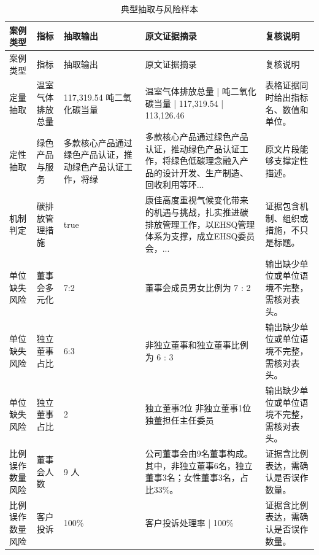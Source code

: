 \setlength{\tabcolsep}{3pt}
\renewcommand{\arraystretch}{1.18}
\begin{longtable}{@{}p{2.0cm}p{2.0cm}p{2.3cm}p{4.9cm}p{2.55cm}@{}}
\caption{典型抽取与风险样本}\label{tab:typical-cases}\\
\toprule
案例类型 & 指标 & 抽取输出 & 原文证据摘录 & 复核说明 \\
\midrule
\endfirsthead
\toprule
案例类型 & 指标 & 抽取输出 & 原文证据摘录 & 复核说明 \\
\midrule
\endhead
定量抽取 & 温室气体排放总量 & 117,319.54 吨二氧化碳当量 & 温室气体排放总量 | 吨二氧化碳当量 | 117,319.54 | 113,126.46 & 表格证据同时给出指标名、数值和单位。 \\
定性抽取 & 绿色产品与服务 & 多款核心产品通过绿色产品认证，推动绿色产品认证工作，将绿 & 多款核心产品通过绿色产品认证，推动绿色产品认证工作，将绿色低碳理念融入产品的设计开发、生产制造、回收利用等环... & 原文片段能够支撑定性描述。 \\
机制判定 & 碳排放管理措施 & true & 康佳高度重视气候变化带来的机遇与挑战，扎实推进碳排放管理工作，以EHSQ管理体系为支撑，成立EHSQ委员会，... & 证据包含机制、组织或措施，不只是标题。 \\
单位缺失风险 & 董事会多元化 & 7:2 & 董事会成员男女比例为 7 : 2 & 输出缺少单位或单位语境不完整，需核对表头。 \\
单位缺失风险 & 独立董事占比 & 6:3 & 非独立董事和独立董事比例为 6 : 3 & 输出缺少单位或单位语境不完整，需核对表头。 \\
单位缺失风险 & 独立董事占比 & 2 & 独立董事2位 非独立董事1位 独董担任主任委员 & 输出缺少单位或单位语境不完整，需核对表头。 \\
比例误作数量风险 & 董事会人数 & 9 人 & 公司董事会由9名董事构成。其中，非独立董事6名，独立董事3名；女性董事3名，占比33\%。 & 证据含比例表达，需确认是否误作数量。 \\
比例误作数量风险 & 客户投诉 & 100\% & 客户投诉处理率 | 100\% & 证据含比例表达，需确认是否误作数量。 \\
\bottomrule
\end{longtable}
